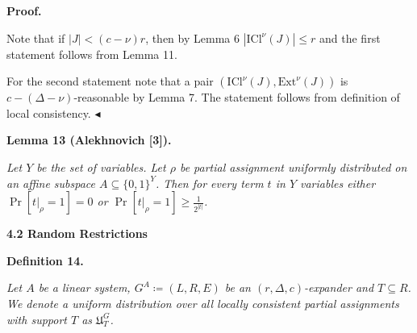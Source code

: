 


\par\medskip\noindent\textbf{Proof.}\par




Note that if $|J|<(c-\nu)r$, then by Lemma 6 $|\mathrm{ICl}^{\nu}\left(J\right)|\leq r$ and
the first statement follows from Lemma 11.\par




For the second statement note that a pair $(\mathrm{ICl}^{\nu}\left(J\right),\mathrm{Ext}^{\nu}\left(J\right))$ is $c-(\Delta-\nu)$-reasonable by Lemma 7. The statement follows from definition of
local consistency.
$\blacktriangleleft$\par





\par\medskip\noindent\textbf{
\textbf{Lemma 13}\textbf{ }(Alekhnovich [3])\textbf{.}
}\par



\emph{Let $Y$ be the set of variables. Let $\rho$ be partial assignment uniformly distributed on an affine
subspace $A\subseteq\{0,1\}^{Y}$. Then for every term $t$ in $Y$ variables either $\Pr[t|_{\rho}=1]=0$ or $\Pr[t|_{\rho}=1]\geq\frac{1}{2^{|t|}}$.}\par








\par\medskip\noindent\textbf{
4.2 Random Restrictions}\par





\par\medskip\noindent\textbf{
\textbf{Definition 14}\textbf{.}
}\par



\emph{Let $A$ be a linear system, $G^{A}\coloneqq(L,R,E)$ be an $(r,\Delta,c)$-expander and $T\subseteq R$. We denote a uniform distribution over all locally consistent partial assignments with
support $T$ as $\mathfrak{U}^{G}_{T}$.}\par




